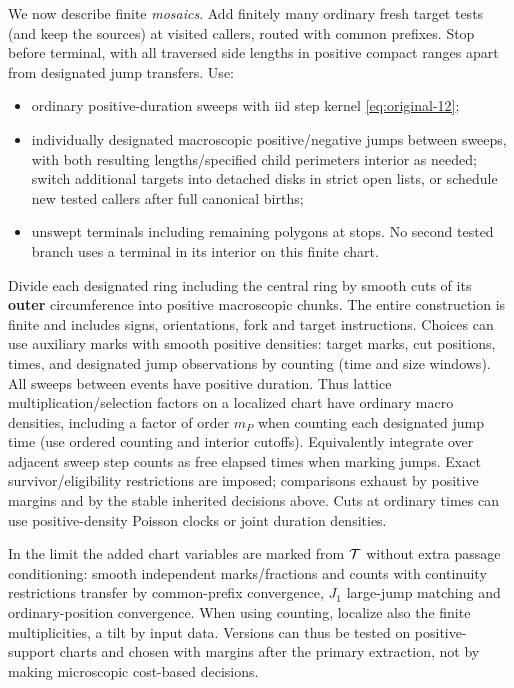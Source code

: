 \begin{definition}\label{kern:mosaic}

We now describe finite \emph{mosaics}. Add finitely many ordinary fresh target tests (and keep the sources)
at visited callers, routed with common prefixes. Stop before terminal, with all traversed side lengths in
positive compact ranges apart from designated jump transfers. Use:
\begin{itemize}
\item ordinary positive-duration sweeps with iid step kernel \eqref{eq:original-12};
\item individually designated macroscopic positive/negative jumps between sweeps, with both resulting lengths/specified child perimeters interior as needed; switch additional targets into detached disks in strict open lists, or schedule new tested callers after full canonical births;
\item unswept terminals including remaining polygons at stops. No second tested branch uses a terminal in its interior on this finite chart.
\end{itemize}
Divide each designated ring including the central ring by smooth cuts of its \textbf{outer} circumference
into positive macroscopic chunks. The entire construction is finite and includes signs, orientations, fork
and target instructions. Choices can use auxiliary marks with smooth positive densities: target marks, cut
positions, times, and designated jump observations by counting (time and size windows). All sweeps between
events have positive duration. Thus lattice multiplication/selection factors on a localized chart have
ordinary macro densities, including a factor of order \(m_P\) when counting each designated jump time (use
ordered counting and interior cutoffs). Equivalently integrate over adjacent sweep step counts as free
elapsed times when marking jumps. Exact survivor/eligibility restrictions are imposed; comparisons exhaust
by positive margins and by the stable inherited decisions above. Cuts at ordinary times can use
positive-density Poisson clocks or joint duration densities.

In the limit the added chart variables are
marked from \({\cal T}\) without extra passage conditioning: smooth independent marks/fractions and counts
with continuity restrictions transfer by common-prefix convergence, \(J_1\) large-jump matching and
ordinary-position convergence. When using counting, localize also the finite multiplicities, a tilt by input
data. Versions can thus be tested on positive-support charts and chosen with margins after the primary
extraction, not by making microscopic cost-based decisions.

\end{definition}

